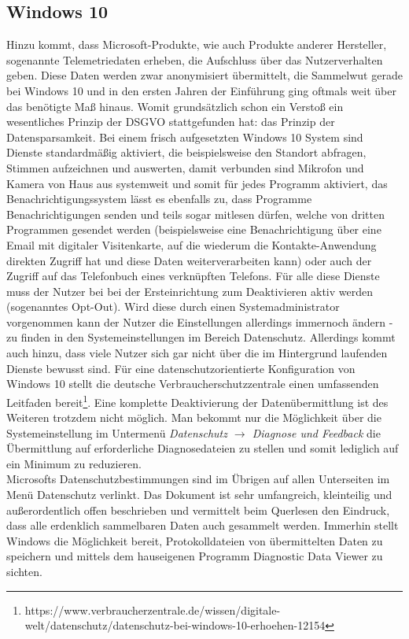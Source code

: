 \subsection{Windows 10}
Hinzu kommt, dass Microsoft-Produkte, wie auch Produkte anderer Hersteller, sogenannte Telemetriedaten erheben, die Aufschluss über das Nutzerverhalten geben. Diese Daten werden zwar anonymisiert übermittelt, die Sammelwut gerade bei Windows 10 und in den ersten Jahren der Einführung ging oftmals weit über das benötigte Maß hinaus. Womit grundsätzlich schon ein Verstoß ein wesentliches Prinzip der DSGVO stattgefunden hat: das Prinzip der Datensparsamkeit. Bei einem frisch aufgesetzten Windows 10 System sind Dienste standardmäßig aktiviert, die beispielsweise den Standort abfragen, Stimmen aufzeichnen und auswerten, damit verbunden sind Mikrofon und Kamera von Haus aus systemweit und somit für jedes Programm aktiviert, das Benachrichtigungssystem lässt es ebenfalls zu, dass Programme Benachrichtigungen senden und teils sogar mitlesen dürfen,
welche von dritten Programmen gesendet werden (beispielsweise eine Benachrichtigung über eine Email mit digitaler Visitenkarte, auf die wiederum die Kontakte-Anwendung direkten Zugriff hat und diese Daten weiterverarbeiten kann) oder auch der Zugriff auf das Telefonbuch eines verknüpften Telefons. Für alle diese Dienste muss der Nutzer bei bei der Ersteinrichtung zum Deaktivieren aktiv werden (sogenanntes Opt-Out). Wird diese durch einen Systemadministrator vorgenommen kann der Nutzer die Einstellungen allerdings immernoch ändern - zu finden in den Systemeinstellungen im Bereich \glqq Datenschutz\grqq{}. Allerdings kommt auch hinzu, dass viele Nutzer sich gar nicht über die im Hintergrund laufenden Dienste bewusst sind. Für eine datenschutzorientierte Konfiguration von Windows 10 stellt die deutsche Verbraucherschutzzentrale einen umfassenden Leitfaden bereit\footnote{https://www.verbraucherzentrale.de/wissen/digitale-welt/datenschutz/datenschutz-bei-windows-10-erhoehen-12154}. Eine komplette Deaktivierung der Datenübermittlung ist des Weiteren trotzdem nicht möglich. Man bekommt nur die Möglichkeit über die Systemeinstellung im Untermenü \textit{Datenschutz $\rightarrow$ Diagnose und Feedback} die Übermittlung auf \glqq erforderliche Diagnosedateien\grqq{} zu stellen und somit lediglich auf ein Minimum zu reduzieren.\\
Microsofts Datenschutzbestimmungen sind im Übrigen auf allen Unterseiten im Menü \glqq Datenschutz\grqq{} verlinkt. Das Dokument ist sehr umfangreich, kleinteilig und außerordentlich offen beschrieben und vermittelt beim Querlesen den Eindruck, dass alle erdenklich sammelbaren Daten auch gesammelt werden. Immerhin stellt Windows die Möglichkeit bereit, Protokolldateien von übermittelten Daten zu speichern und mittels dem hauseigenen Programm \glqq Diagnostic Data Viewer\grqq{} zu sichten.

